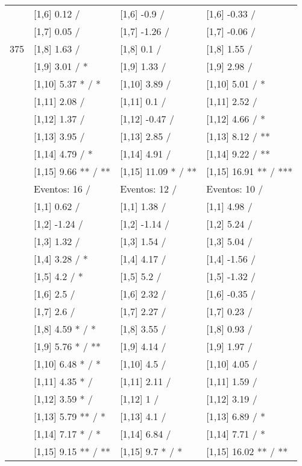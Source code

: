 \begin{table}
\begin{tabular}[t]{llll}
 & {}[1,6] 0.12  / & {}[1,6] -0.9  / & {}[1,6] -0.33  /\\
 & {}[1,7] 0.05  / & {}[1,7] -1.26  / & {}[1,7] -0.06  /\\
375 & {}[1,8] 1.63  / & {}[1,8] 0.1  / & {}[1,8] 1.55  /\\
\addlinespace
 & {}[1,9] 3.01  / * & {}[1,9] 1.33  / & {}[1,9] 2.98  /\\
 & {}[1,10] 5.37 * / * & {}[1,10] 3.89  / & {}[1,10] 5.01  / *\\
 & {}[1,11] 2.08  / & {}[1,11] 0.1  / & {}[1,11] 2.52  /\\
 & {}[1,12] 1.37  / & {}[1,12] -0.47  / & {}[1,12] 4.66  / *\\
 & {}[1,13] 3.95  / & {}[1,13] 2.85  / & {}[1,13] 8.12  / **\\
\addlinespace
 & {}[1,14] 4.79  / * & {}[1,14] 4.91  / & {}[1,14] 9.22  / **\\
 & {}[1,15] 9.66 ** / ** & {}[1,15] 11.09 * / ** & {}[1,15] 16.91 ** / ***\\
 & Eventos:  16 / & Eventos:  12 / & Eventos:  10 /\\
 & {}[1,1] 0.62  / & {}[1,1] 1.38  / & {}[1,1] 4.98  /\\
 & {}[1,2] -1.24  / & {}[1,2] -1.14  / & {}[1,2] 5.24  /\\
\addlinespace
 & {}[1,3] 1.32  / & {}[1,3] 1.54  / & {}[1,3] 5.04  /\\
 & {}[1,4] 3.28  / * & {}[1,4] 4.17  / & {}[1,4] -1.56  /\\
 & {}[1,5] 4.2  / * & {}[1,5] 5.2  / & {}[1,5] -1.32  /\\
 & {}[1,6] 2.5  / & {}[1,6] 2.32  / & {}[1,6] -0.35  /\\
 & {}[1,7] 2.6  / & {}[1,7] 2.27  / & {}[1,7] 0.23  /\\
\addlinespace
500 & {}[1,8] 4.59 * / * & {}[1,8] 3.55  / & {}[1,8] 0.93  /\\
 & {}[1,9] 5.76 * / ** & {}[1,9] 4.14  / & {}[1,9] 1.97  /\\
 & {}[1,10] 6.48 * / * & {}[1,10] 4.5  / & {}[1,10] 4.05  /\\
 & {}[1,11] 4.35 * / & {}[1,11] 2.11  / & {}[1,11] 1.59  /\\
 & {}[1,12] 3.59 * / & {}[1,12] 1  / & {}[1,12] 3.19  /\\
\addlinespace
 & {}[1,13] 5.79 ** / * & {}[1,13] 4.1  / & {}[1,13] 6.89  / *\\
 & {}[1,14] 7.17 * / * & {}[1,14] 6.84  / & {}[1,14] 7.71  / *\\
 & {}[1,15] 9.15 ** / ** & {}[1,15] 9.7 * / * & {}[1,15] 16.02 ** / **\\
\bottomrule
\end{tabular}
\end{table}

